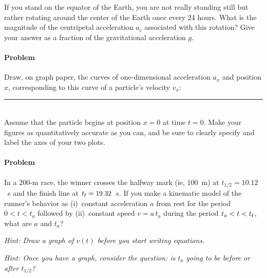 \documentclass[12pt]{article}
\newcounter{problem}
\begin{document}
If you stand on the equator of the Earth, you are not really standing
still but rather rotating around the center of the Earth once every 24
hours.  What is the magnitude of the centripetal acceleration
$a_\mathrm{c}$ associated with this rotation?  Give your answer as a
fraction of the gravitational acceleration $g$.

\paragraph{Problem~\theproblem}

Draw, on graph paper, the curves of one-dimensional acceleration $a_x$
and position $x$, corresponding to this curve of a particle's velocity
$v_x$:
\\ \rule{0.1\textwidth}{0pt}
\\
Assume that the particle begins at position $x=0$ at time $t=0$.  Make
your figures as quantitatively accurate as you can, and be sure to
clearly specify and label the axes of your two plots.

\paragraph{Problem~\theproblem}

In a 200-m race, the winner crosses the halfway mark (ie, 100~m) at
$t_{1/2}=10.12$~s and the finish line at $t_{\rm f}=19.32$~s.  If you
make a kinematic model of the runner's behavior as (i)~constant
acceleration $a$ from rest for the period $0<t<t_a$ followed by
(ii)~constant speed $v=a\,t_a$ during the period $t_a<t<t_{\rm f}$,
what are $a$ and $t_a$?

\emph{Hint: Draw a graph of $v(t)$ before you start writing equations.}

\emph{Hint: Once you have a graph, consider the question: is $t_a$
going to be before or after $t_{1/2}$?}
\end{document}
